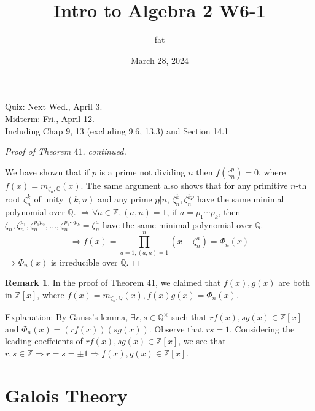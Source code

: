 \documentclass{article}
\title{Intro to Algebra 2 W6-1}
\author{fat}
\date{March 28, 2024}
\theoremstyle{definition}
\newtheorem{rem}{Remark}
\newenvironment{proofs}[1][\proofname]{%
  \begin{proof}[#1]$ $\par\nobreak\ignorespaces
}{%
  \end{proof}
}
\begin{document}
\maketitle
\thispagestyle{fancy}
\renewcommand{\footrulewidth}{0.4pt}
\cfoot{\thepage}
\renewcommand{\headrulewidth}{0.4pt}

\noindent Quiz: Next Wed., April 3.\\
Midterm: Fri., April 12.\\
Including Chap 9, 13 (excluding 9.6, 13.3) and Section 14.1

\begin{proofs}[Proof of Theorem $41$, continued]
	\par We have shown that if $p$ is a prime not dividing $n$ then $f(\zeta_n^p) = 0$, where $f(x) = m_{\zeta_n, \mathbb{Q}}(x)$.
	The same argument also shows that for any primitive $n$-th root $\zeta_n^k$ of unity $(k, n)$ and any prime $p \not| n$, $\zeta_n^k, \zeta_n^{kp}$ have the same minimal polynomial over $\mathbb{Q}$.
	$\Rightarrow \forall a \in \mathbb{Z}, (a, n) = 1$, if $a = p_1 \cdots p_k$, then $\zeta_n, \zeta_n^{p_1}, \zeta_n^{p_1 p_2}, ..., \zeta_n^{p_1 \cdots p_k} = \zeta_n^a$ have the same minimal polynomial over $\mathbb{Q}$.
	\[
		\Rightarrow f(x) = \prod_{a = 1, (a, n) = 1}^n (x - \zeta_n^a) = \Phi_n(x)
	\]
	$\Rightarrow \Phi_n(x)$ is irreducible over $\mathbb{Q}$.
\end{proofs}

\begin{rem}
	In the proof of Theorem 41, we claimed that $f(x), g(x)$ are both in $\mathbb{Z}[x]$, where $f(x) = m_{\zeta_n, \mathbb{Q}}(x), f(x) g(x) =  \Phi_n(x)$.
	\par Explanation: By Gauss's lemma, $\exists r, s \in \mathbb{Q}^\times$ such that $r f(x), s g(x) \in \mathbb{Z}[x]$ and $\Phi_n(x) = (r f(x)) (s g(x))$.
	Observe that $rs = 1$.
	Considering the leading coeffcients of $r f(x), s g(x) \in \mathbb{Z}[x]$, we see that $r, s \in \mathbb{Z} \Rightarrow r = s = \pm 1 \Rightarrow f(x), g(x) \in \mathbb{Z}[x]$.
\end{rem}

\section*{Galois Theory}
\end{document}
